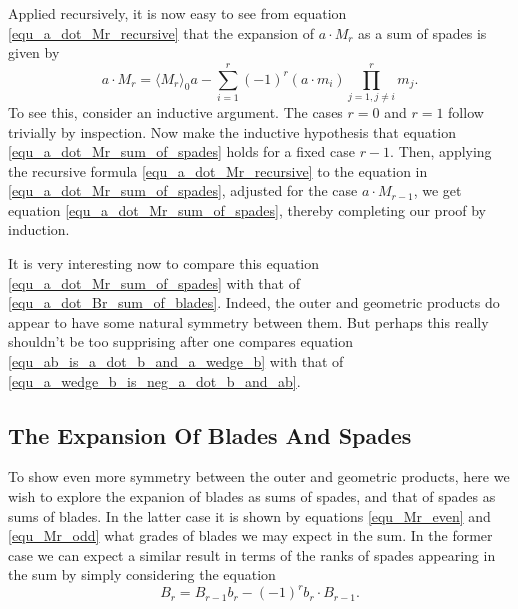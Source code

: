 \documentclass{birkjour}
\theoremstyle{definition}
\theoremstyle{remark}
\numberwithin{equation}{section}
\begin{document}
Applied recursively, it is now easy to see from equation \eqref{equ_a_dot_Mr_recursive} that the expansion of
$a\cdot M_r$ as a sum of spades is given by
\begin{equation}\label{equ_a_dot_Mr_sum_of_spades}
a\cdot M_r = \langle M_r\rangle_0a - \sum_{i=1}^r(-1)^r(a\cdot m_i)\prod_{j=1,j\neq i}^rm_j.
\end{equation}
To see this, consider an inductive argument.  The cases $r=0$ and $r=1$ follow trivially by inspection.
Now make the inductive hypothesis that equation \eqref{equ_a_dot_Mr_sum_of_spades} holds for a fixed case $r-1$.
Then, applying the recursive formula \eqref{equ_a_dot_Mr_recursive} to the equation in \eqref{equ_a_dot_Mr_sum_of_spades},
adjusted for the case $a\cdot M_{r-1}$, we get equation \eqref{equ_a_dot_Mr_sum_of_spades}, thereby completing
our proof by induction.

It is very interesting now to compare this equation \eqref{equ_a_dot_Mr_sum_of_spades} with that of \eqref{equ_a_dot_Br_sum_of_blades}.
Indeed, the outer and geometric products do appear to have some natural symmetry between them.  But perhaps this really shouldn't be
too supprising after one compares equation \eqref{equ_ab_is_a_dot_b_and_a_wedge_b} with that of \eqref{equ_a_wedge_b_is_neg_a_dot_b_and_ab}.


\subsection{The Expansion Of Blades And Spades}

To show even more symmetry between the outer and geometric products, here we wish to explore the expanion of
blades as sums of spades, and that of spades as sums of blades.
In the latter case it is shown by equations \eqref{equ_Mr_even} and \eqref{equ_Mr_odd} what grades of blades we may expect in the sum.
In the former case we can expect a similar result in terms of the ranks of spades appearing in the sum by simply
considering the equation
\begin{equation}\label{equ_exp_Br_recursive}
B_r = B_{r-1}b_r - (-1)^rb_r\cdot B_{r-1}.
\end{equation}
\end{document}
